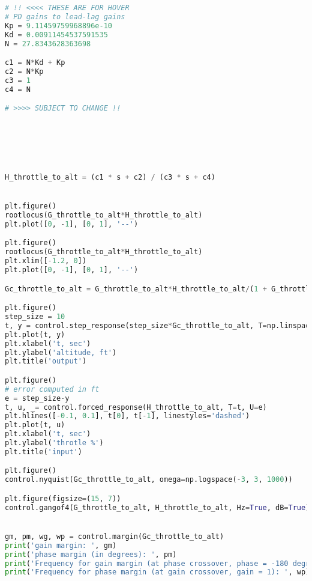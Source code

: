 \begin{lstlisting}[language=Python]
# !! <<<< THESE ARE FOR HOVER 
# PD gains to lead-lag gains 
Kp = 9.11459759968896e-10
Kd = 0.00911454537591535
N = 27.8343628363698

c1 = N*Kd + Kp
c2 = N*Kp
c3 = 1
c4 = N

# >>>> SUBJECT TO CHANGE !!






H_throttle_to_alt = (c1 * s + c2) / (c3 * s + c4)


plt.figure()
rootlocus(G_throttle_to_alt*H_throttle_to_alt)
plt.plot([0, -1], [0, 1], '--')

plt.figure()
rootlocus(G_throttle_to_alt*H_throttle_to_alt)
plt.xlim([-1.2, 0])
plt.plot([0, -1], [0, 1], '--')

Gc_throttle_to_alt = G_throttle_to_alt*H_throttle_to_alt/(1 + G_throttle_to_alt*H_throttle_to_alt)

plt.figure()
step_size = 10
t, y = control.step_response(step_size*Gc_throttle_to_alt, T=np.linspace(0, 40, 1000))
plt.plot(t, y)
plt.xlabel('t, sec')
plt.ylabel('altitude, ft')
plt.title('output')

plt.figure()
# error computed in ft
e = step_size-y
t, u, _= control.forced_response(H_throttle_to_alt, T=t, U=e)
plt.hlines([-0.1, 0.1], t[0], t[-1], linestyles='dashed')
plt.plot(t, u)
plt.xlabel('t, sec')
plt.ylabel('throtle %')
plt.title('input')

plt.figure()
control.nyquist(Gc_throttle_to_alt, omega=np.logspace(-3, 3, 1000))

plt.figure(figsize=(15, 7))
control.gangof4(G_throttle_to_alt, H_throttle_to_alt, Hz=True, dB=True)


gm, pm, wg, wp = control.margin(Gc_throttle_to_alt)
print('gain margin: ', gm)
print('phase margin (in degrees): ', pm)
print('Frequency for gain margin (at phase crossover, phase = -180 degrees): ', wg)
print('Frequency for phase margin (at gain crossover, gain = 1): ', wp)
\end{lstlisting}
